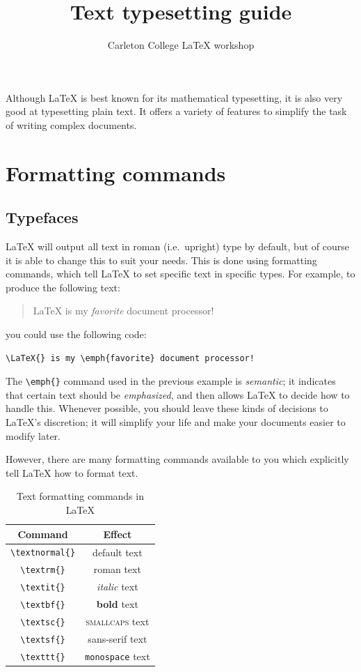 \documentclass{article}
\title{Text typesetting guide}
\author{Carleton College \LaTeX{} workshop}
\date{}
\newcommand*{\code}[1]{\texttt{#1}}
\begin{document}
\maketitle

Although \LaTeX{} is best known for its mathematical typesetting, it is also very good at typesetting plain text.
It offers a variety of features to simplify the task of writing complex documents.

\section{Formatting commands}
\label{s:format}
\subsection{Typefaces}
\label{s:typefaces}
\LaTeX{} will output all text in roman (i.e.~upright) type by default, but of course it is able to change this to suit your needs.
This is done using formatting commands, which tell \LaTeX{} to set specific text in specific types.
For example, to produce the following text:
\begin{quote}
  \LaTeX{} is my \emph{favorite} document processor!
\end{quote}
you could use the following code:
\begin{verbatim}
\LaTeX{} is my \emph{favorite} document processor!
\end{verbatim}

The \code{\textbackslash{}emph\{\}} command used in the previous example is \emph{semantic}; it indicates that certain text should be \emph{emphasized}, and then allows \LaTeX{} to decide how to handle this.
Whenever possible, you should leave these kinds of decisions to \LaTeX{}'s discretion; it will simplify your life and make your documents easier to modify later.

However, there are many formatting commands available to you which explicitly tell \LaTeX{} how to format text.

\begin{table}[htb]
  \centering{}
  \begin{tabular}{c c}
    \toprule
    Command & Effect \\ \midrule
    \code{\textbackslash{}textnormal\{\}} & default text \\
    \code{\textbackslash{}textrm\{\}}  & \textrm{roman} text \\
    \code{\textbackslash{}textit\{\}} & \textit{italic} text \\
    \code{\textbackslash{}textbf\{\}} & \textbf{bold} text \\
    \code{\textbackslash{}textsc\{\}} & \textsc{smallcaps} text \\
    \code{\textbackslash{}textsf\{\}} & \textsf{sans-serif} text \\
    \code{\textbackslash{}texttt\{\}} & \texttt{monospace} text \\
    \bottomrule
  \end{tabular}
  \caption{Text formatting commands in \LaTeX{}}
  \label{tab:formcommands}
\end{table}
\end{document}
